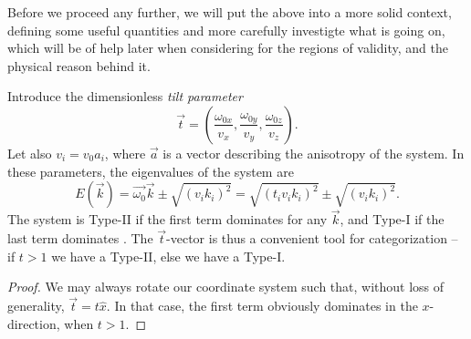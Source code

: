 Before we proceed any further, we will put the above into a more solid context, defining some useful quantities and more carefully investigte what is going on, which will be of help later when considering for the regions of validity, and the physical reason behind it.


Introduce the dimensionless \emph{tilt parameter}
\[
  \vec{t} =
  \left(
  \frac{\omega_{0x}}{v_{x}},
  \frac{\omega_{0y}}{v_{y}},
  \frac{\omega_{0z}}{v_{z}}
\right).
\]
Let also \(v_{i} = v_{0} a_{i}\), where \(\vec{a}\) is a vector describing the anisotropy of the system.
In these parameters, the eigenvalues of the system are
\begin{equation}
  \label{eq:14}
  E(\vec{k}) = \vec{\omega_{0}} \vec{k} \pm \sqrt{(v_{i} k_{i})^{2}} = \sqrt{(t_{i} v_{i} k_{i})^{2}} \pm \sqrt{(v_{i} k_{i})^{2}}.
\end{equation}
The system is Type-II if the first term dominates for any \(\vec{k}\), and Type-I if the last term dominates \cite{soluyanovTypeIIWeylSemimetals2015}.
The \(\vec{t}\)-vector is thus a convenient tool for categorization -- if \(t > 1\) we have a Type-II, else we have a Type-I.
\begin{proof}
  We may always rotate our coordinate system such that, without loss of generality, \(\vec{t} = t \hat{x}\).
  In that case, the first term obviously dominates in the \(x\)-direction, when $t>1$.
\end{proof}


